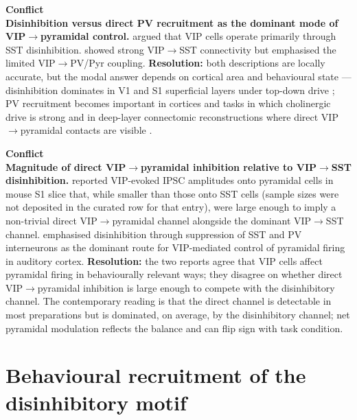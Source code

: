\documentclass[11pt]{article}
\let\origrightarrow\rightarrow
\def\rightarrow{\ensuremath{\origrightarrow}}
\begin{document}
\begin{framed}
\textbf{Conflict}\\
\textbf{Disinhibition versus direct PV recruitment as the dominant mode of VIP\rightarrow pyramidal control.} \citet{Pi2013} argued that VIP cells operate primarily through SST disinhibition. \citet{Pfeffer2013} showed strong VIP\rightarrow SST connectivity but emphasised the limited VIP\rightarrow PV/Pyr coupling. \textbf{Resolution:} both descriptions are locally accurate, but the modal answer depends on cortical area and behavioural state --- disinhibition dominates in V1 and S1 superficial layers under top-down drive \citep{Zhang2014, Lee2013}; PV recruitment becomes important in cortices and tasks in which cholinergic drive is strong \citep{Kuchibhotla2017, Williams2019} and in deep-layer connectomic reconstructions where direct VIP\rightarrow pyramidal contacts are visible \citep{Schneidermizell2025}.
\end{framed}

\begin{framed}
\textbf{Conflict}\\
\textbf{Magnitude of direct VIP\rightarrow pyramidal inhibition relative to VIP\rightarrow SST disinhibition.} \citet{Lee2013} reported VIP-evoked IPSC amplitudes onto pyramidal cells in mouse S1 slice that, while smaller than those onto SST cells (sample sizes were not deposited in the curated row for that entry), were large enough to imply a non-trivial direct VIP\rightarrow pyramidal channel alongside the dominant VIP\rightarrow SST channel. \citet{Pi2013} emphasised disinhibition through suppression of SST and PV interneurons as the dominant route for VIP-mediated control of pyramidal firing in auditory cortex. \textbf{Resolution:} the two reports agree that VIP cells affect pyramidal firing in behaviourally relevant ways; they disagree on whether direct VIP\rightarrow pyramidal inhibition is large enough to compete with the disinhibitory channel. The contemporary reading \citep{Karnani2016a, Karnani2016b, Yu2019, Schneidermizell2025} is that the direct channel is detectable in most preparations but is dominated, on average, by the disinhibitory channel; net pyramidal modulation reflects the balance and can flip sign with task condition.
\end{framed}

\section{Behavioural recruitment of the disinhibitory motif}
\end{document}
